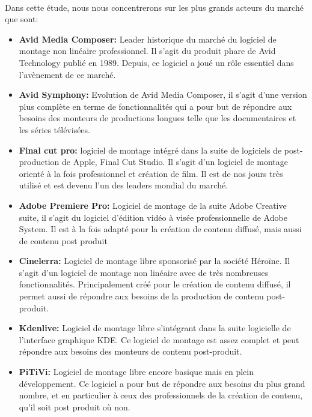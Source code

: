 \paragraph{}
  Dans cette étude, nous nous concentrerons sur les plus grands acteurs du marché que sont:
  \begin{itemize}
    \item{\textbf{Avid Media Composer:} Leader historique du marché du logiciel de montage non linéaire
      professionnel. Il s'agit du produit phare de Avid Technology publié en 1989. Depuis, ce
      logiciel a joué un rôle essentiel dans l'avènement de ce marché.}
    \item{\textbf{Avid Symphony:} Evolution de Avid Media Composer, il s'agit d'une version plus complète en terme
      de fonctionnalités qui a pour but de répondre aux besoins des monteurs de productions longues telle que
      les documentaires et les séries télévisées.}
    \item{\textbf{Final cut pro:} logiciel de montage intégré dans la suite de logiciels de post-production
          de Apple, Final Cut Studio. Il s'agit d'un logiciel de montage orienté à la fois
          professionnel et création de film. Il est de nos jours très utilisé et est devenu l'un
          des leaders mondial du marché.}
    \item{\textbf{Adobe Premiere Pro:} Logiciel de montage de la suite Adobe Creative suite, il s'agit du logiciel
      d'édition vidéo à visée professionnelle de Adobe System. Il est à la fois adapté pour la création
      de contenu diffusé, mais aussi de contenu post produit}
    \item{\textbf{Cinelerra:} Logiciel de montage libre sponsorisé par la société Héroïne. Il s'agit d'un logiciel
      de montage non linéaire avec de très nombreuses fonctionnalités. Principalement créé pour le création de contenu
      diffusé, il permet aussi de répondre aux besoins de la production de contenu post-produit.}
    \item{\textbf{Kdenlive:} Logiciel de montage libre s'intégrant dans la suite logicielle de l'interface graphique KDE.
      Ce logiciel de montage est assez complet et peut répondre aux besoins des monteurs de contenu post-produit.}
    \item{\textbf{PiTiVi:} Logiciel de montage libre encore basique mais en plein développement. Ce logiciel a pour
      but de répondre aux besoins du plus grand nombre, et en particulier à ceux des professionnels de la création de
      contenu, qu'il soit post produit où non.}
  \end{itemize}

